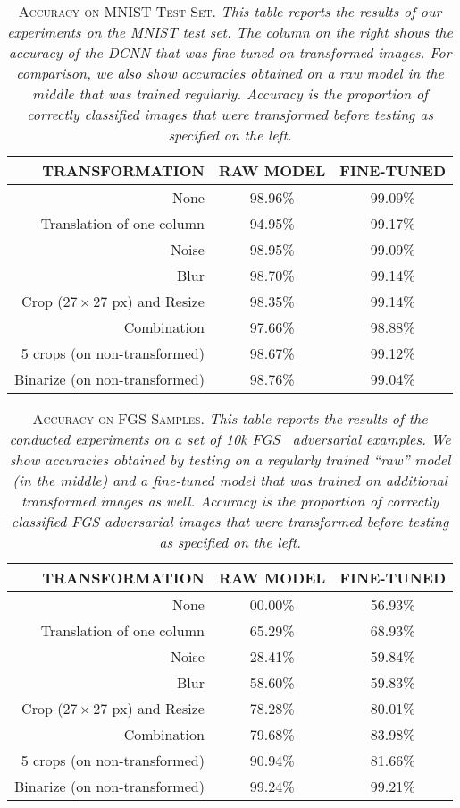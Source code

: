 \documentclass[conference]{IEEEtran}
\renewcommand\cap[3]{\caption[#2]{\label{#1}\textsc{#2}. \small\textit{#3}}}
\begin{document}
\begin{table}[t]
\footnotesize
\centering\vspace*{1.55ex}
\begin{tabular}{r|c|c}
\toprule
TRANSFORMATION              				& RAW MODEL	& FINE-TUNED\\ \midrule \midrule
None                        				& 98.96\%	& 99.09\%\\
Translation of one column   				& 94.95\%	& 99.17\%\\ 
Noise                       				& 98.95\%	& 99.09\%\\ 
Blur   	                    				& 98.70\%	& 99.14\%\\ 
Crop (27\,$\times$\,27 px) and Resize	& 98.35\%	& 99.14\%\\ 
Combination								& 97.66\% 	& 98.88\%\\ \midrule 
5 crops (on non-transformed)   			& 98.67\%	& 99.12\%\\
Binarize (on non-transformed)   			& 98.76\%	& 99.04\%\\
\bottomrule
\end{tabular}%
\cap{table:mnist}{Accuracy on MNIST Test Set}{This table reports the results of our experiments on the MNIST test set. The column on the right shows the accuracy of the DCNN that was fine-tuned on transformed images. For comparison, we also show accuracies obtained on a raw model in the middle that was trained regularly. Accuracy is the proportion of correctly classified images that were transformed before testing as specified on the left.}
\end{table}

\begin{table}[t]
\footnotesize
\centering
\begin{tabular}{r|c|c}
\toprule
TRANSFORMATION              				& RAW MODEL	& FINE-TUNED\\ \midrule \midrule
None                        				& 00.00\%  	& 56.93\%\\
Translation of one column   				& 65.29\%	& 68.93\%\\
Noise                       				& 28.41\%	& 59.84\%\\
Blur                        				& 58.60\%  	& 59.83\%\\
Crop (27\,$\times$\,27 px) and Resize  	& 78.28\%	& 80.01\%\\
Combination								& 79.68\%	& 83.98\%\\ \midrule 
5 crops (on non-transformed)    			& 90.94\% 	& 81.66\%\\
Binarize (on non-transformed)   			& 99.24\% 	& 99.21\%\\
\bottomrule
\end{tabular}
\cap{table:fgs}{Accuracy on FGS Samples}{This table reports the results of the conducted experiments on a set of 10k FGS~\cite{c5} adversarial examples. We show accuracies obtained by testing on a regularly trained ``raw'' model (in the middle) and a fine-tuned model that was trained on additional transformed images as well. Accuracy is the proportion of correctly classified FGS adversarial images that were transformed before testing as specified on the left.}
\end{table}
\end{document}
